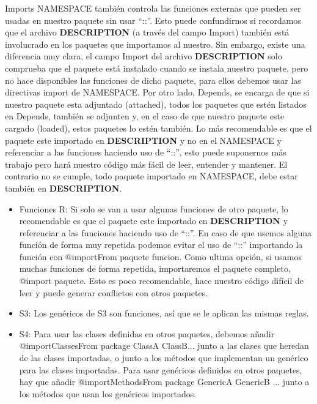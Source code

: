Imports
NAMESPACE tambi\'en controla las funciones externas que pueden ser usadas en nuestro
paquete sin usar “::”. Esto puede confundirnos si recordamos que el archivo \textbf{DESCRIPTION}
(a trav\'es del campo Import) tambi\'en est\'a involucrado en los paquetes que importamos al
nuestro. Sin embargo, existe una diferencia muy clara, el campo Import del archivo
\textbf{DESCRIPTION} solo comprueba que el paquete est\'a instalado cuando se instala nuestro
paquete, pero no hace disponibles las funciones de dicho paquete, para ellos debemos usar
las directivas import de NAMESPACE.
Por otro lado, Depends, se encarga de que si nuestro paquete esta adjuntado (attached),
todos los paquetes que est\'en listados en Depends, tambi\'en se adjunten y, en el caso de que
nuestro paquete este cargado (loaded), estos paquetes lo est\'en tambi\'en.
Lo m\'as recomendable es que el paquete este importado en \textbf{DESCRIPTION} y no en el
NAMESPACE y referenciar a las funciones haciendo uso de “::”, esto puede suponernos m\'as
trabajo pero har\'a nuestro c\'odigo m\'as f\'acil de leer, entender y mantener. El contrario no se
cumple, todo paquete importado en NAMESPACE, debe estar tambi\'en en \textbf{DESCRIPTION}.

\begin{itemize}
    \item Funciones R:
Si solo se van a usar algunas funciones de otro paquete, lo recomendable es que el
paquete este importado en \textbf{DESCRIPTION} y referenciar a las funciones haciendo uso
de “::”.
En caso de que usemos alguna funci\'on de forma muy repetida podemos evitar el uso
de “::” importando la funci\'on con @importFrom paquete funcion.
Como ultima opci\'on, si usamos muchas funciones de forma repetida, importaremos el
paquete completo, @import paquete. Esto es poco recomendable, hace nuestro
c\'odigo dif\'icil de leer y puede generar conflictos con otros paquetes.
    \item S3:
Los gen\'ericos de S3 son funciones, as\'i que se le aplican las mismas reglas.
    \item S4:
Para usar las clases definidas en otros paquetes, debemos a\~nadir
@importClassesFrom package ClassA ClassB... junto a las clases que heredan de
las clases importadas, o junto a los m\'etodos que implementan un gen\'erico para las
clases importadas.
Para usar gen\'ericos definidos en otros paquetes, hay que a\~nadir
@importMethodsFrom package GenericA GenericB ... junto a los m\'etodos que usan
los gen\'ericos importados.
\end{itemize}

